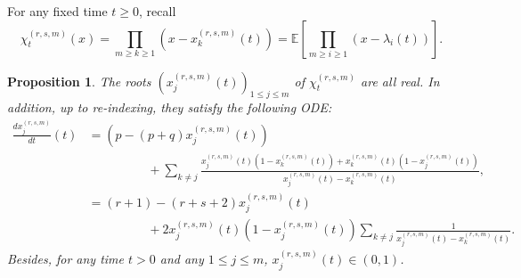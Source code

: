 \documentclass[12pt,reqno]{amsart}
\newtheorem{proposition}{Proposition}
\begin{document}
For any fixed time $t \geq 0$, recall
\begin{equation}
	\label{eqn:averagedpolynomial}
	\chi_t^{(r,s,m)}(x) = \prod_{m \geq k \geq 1}(x-x_{k}^{(r,s,m)}(t))= \mathbb{E}\left[\prod_{m \geq i \geq 1}(x-\lambda_i(t))\right].
\end{equation}
\begin{proposition}
	\label{prop:positivityoftheroot}
	The roots $(x_j^{(r,s,m)}(t))_{1 \leq j\leq m}$ of $\chi_{t}^{(r,s,m)}$ are all real. In addition, up to re-indexing, they satisfy the following ODE:
	\begin{align}\label{ODEroot}
		\frac{dx_j^{(r,s,m)}}{dt}(t) & = (p - (p+q)x_j^{(r,s,m)}(t)) \\&\hspace{2cm}+
		\sum_{k \neq j} \frac{x_j^{(r,s,m)}(t)(1-x_k^{(r,s,m)}(t))+x_k^{(r,s,m)}(t)(1-x_j^{(r,s,m)}(t))}{x_j^{(r,s,m)}(t)-x_k^{(r,s,m)}(t)},		\nonumber
		\\&  = (r+1) - (r+s+2)x_j^{(r,s,m)}(t) 		\nonumber
        \\ &\hspace{2cm}+ 2x_j^{(r,s,m)}(t)(1-x_j^{(r,s,m)}(t))
		\sum_{k \neq j} \frac{1}{x_j^{(r,s,m)}(t)-x_k^{(r,s,m)}(t)}.
		\nonumber
	\end{align}
	Besides, for any time $t > 0$ and any $1 \leq j \leq m$, $x_j^{(r,s,m)}(t) \in (0,1)$.
\end{proposition}
\end{document}
